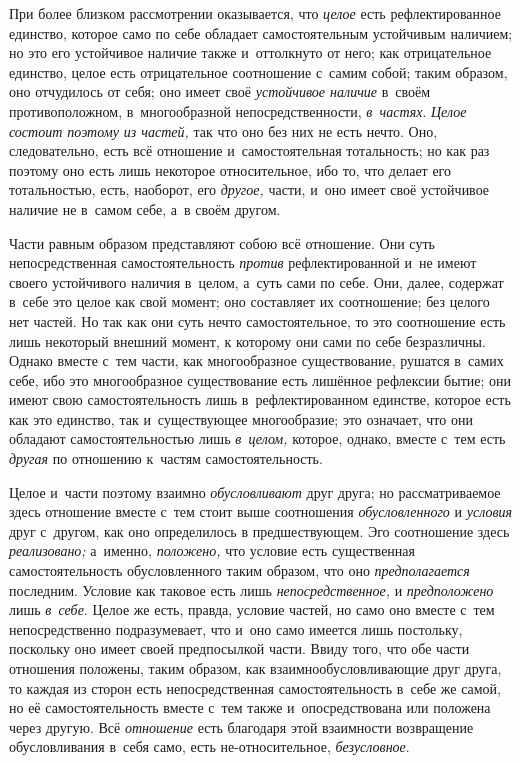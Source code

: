 При более близком рассмотрении оказывается, что
{\em целое} есть рефлектированное единство, которое
само по себе обладает самостоятельным устойчивым наличием; но это его
устойчивое наличие также и~оттолкнуто от него; как отрицательное единство,
целое есть отрицательное соотношение с~самим собой; таким образом, оно
отчудилось от себя; оно имеет своё {\em устойчивое
наличие} в~своём противоположном, в~многообразной непосредственности,
{\em в~частях}. {\em Целое состоит
поэтому из частей,} так что оно без них не есть нечто. Оно, следовательно,
есть всё отношение и~самостоятельная тотальность; но как раз поэтому оно
есть лишь некоторое относительное, ибо то, что делает его тотальностью,
есть, наоборот, его {\em другое,} части, и~оно имеет
своё устойчивое наличие не в~самом себе, а~в своём другом.

Части равным образом представляют собою всё отношение. Они суть
непосредственная самостоятельность {\em против}
рефлектированной и~не имеют своего устойчивого наличия в~целом, а~суть сами
по себе. Они, далее, содержат в~себе это целое как свой момент; оно
составляет их соотношение; без целого нет частей. Но так как они суть нечто
самостоятельное, то это соотношение есть лишь некоторый внешний момент, к
которому они сами по себе безразличны. Однако вместе с~тем части, как
многообразное существование, рушатся в~самих себе, ибо это многообразное
существование есть лишённое рефлексии бытие; они имеют свою
самостоятельность лишь в~рефлектированном единстве, которое есть как это
единство, так и~существующее многообразие; это означает, что они обладают
самостоятельностью лишь {\em в~целом,} которое, однако,
вместе с~тем есть {\em другая} по отношению к~частям самостоятельность.

Целое и~части поэтому взаимно {\em обусловливают} друг
друга; но рассматриваемое здесь отношение вместе с~тем стоит выше
соотношения {\em обусловленного} и
{\em условия} друг с~другом, как оно определилось в
предшествующем. Эго соотношение здесь {\em реализовано;} а~именно,
{\em положено,} что условие есть существенная
самостоятельность обусловленного таким образом, что оно
{\em предполагается} последним. Условие как таковое
есть лишь {\em непосредственное,} и {\em предположено} лишь
{\em в~себе}. Целое же есть, правда, условие частей, но само оно вместе
с~тем непосредственно подразумевает, что и~оно само имеется лишь постольку,
поскольку оно имеет своей предпосылкой части. Ввиду того, что обе части
отношения положены, таким образом, как взаимнообусловливающие друг друга,
то каждая из сторон есть непосредственная самостоятельность в~себе же
самой, но её самостоятельность вместе с~тем также и~опосредствована или
положена через другую. Всё {\em отношение} есть
благодаря этой взаимности возвращение обусловливания в~себя само, есть
не-относительное, {\em безусловное}.

